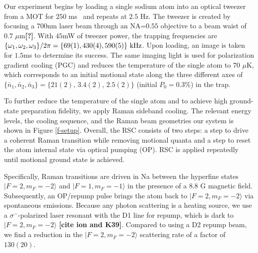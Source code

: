 \documentclass[aps,prl,twocolumn,groupedaddress]{revtex4-1}
\newcommand{\fxnote}[1]{{\textbf{[#1]}}}
\begin{document}
Our experiment begins by loading a single sodium atom into an optical tweezer from a MOT
for $250$ ms~\cite{Hutzler2017-LightShifts} and repeats at $2.5$ Hz.
The tweezer is created by focusing a $700$nm laser beam through an NA=$0.55$ objective to
a beam waist of $0.7$ $\mu$m\fxnote{?}.
With $45$mW of tweezer power, the trapping frequencies are
$\{\omega_1,\omega_2,\omega_3\}/2\pi = \{69(1), 430(4), 590(5)\}\ \text{\text{kHz}}$.
Upon loading, an image is taken for $1.5$ms to determine its success.
The same imaging light is used for polarization gradient cooling (PGC) and
reduces the temperature of the single atom to $70$ $\mu$K,
which corresponds to an initial motional state along the three different axes of
$\{\bar n_1, \bar n_2, \bar n_3\}=\{21(2),\, 3.4(2),\, 2.5(2)\}$ (initial $P_0=0.3\%$) in the trap.

To further reduce the temperature of the single atom and
to achieve high ground-state preparation fidelity, we apply Raman sideband cooling.
The relevant energy levels, the cooling sequence, and the Raman beam geometries our system
is shown in Figure \ref{f-setup}. Overall, the RSC consists of two steps:
a step to drive a coherent Raman transition while removing motional quanta and
a step to reset the atom internal state via optical pumping (OP).
RSC is applied repeatedly until motional ground state is achieved.

Specifically, Raman transitions are driven in Na between the hyperfine states
$|F=2, m_F=-2\rangle$ and  $|F=1, m_F=-1\rangle$ in the presence of a $8.8$ G magnetic field.
Subsequently, an OP/repump pulse brings the atom back to $|F=2, m_F=-2\rangle$
via spontaneous emissions.
Because any photon scattering is a heating source,
we use a $\sigma^-$-polarized laser resonant with the D1 line for repump,
which is dark to $|F=2, m_F=-2\rangle$ \fxnote{cite ion and K39}.
Compared to using a D2 repump beam, we find a reduction in the $|F=2, m_F=-2\rangle$
scattering rate of a factor of $130(20)$.
\end{document}
